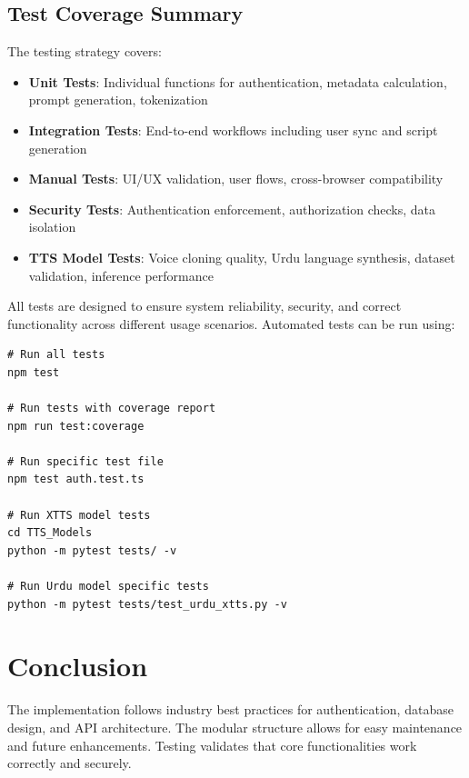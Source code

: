 \subsection{Test Coverage Summary}

The testing strategy covers:

\begin{itemize}
    \item \textbf{Unit Tests}: Individual functions for authentication, metadata calculation, prompt generation, tokenization
    \item \textbf{Integration Tests}: End-to-end workflows including user sync and script generation
    \item \textbf{Manual Tests}: UI/UX validation, user flows, cross-browser compatibility
    \item \textbf{Security Tests}: Authentication enforcement, authorization checks, data isolation
    \item \textbf{TTS Model Tests}: Voice cloning quality, Urdu language synthesis, dataset validation, inference performance
\end{itemize}

All tests are designed to ensure system reliability, security, and correct functionality across different usage scenarios. Automated tests can be run using:

\begin{verbatim}
# Run all tests
npm test

# Run tests with coverage report
npm run test:coverage

# Run specific test file
npm test auth.test.ts

# Run XTTS model tests
cd TTS_Models
python -m pytest tests/ -v

# Run Urdu model specific tests
python -m pytest tests/test_urdu_xtts.py -v
\end{verbatim}


\section{Conclusion}

The implementation follows industry best practices for authentication, database design, and API architecture. The modular structure allows for easy maintenance and future enhancements. Testing validates that core functionalities work correctly and securely.

